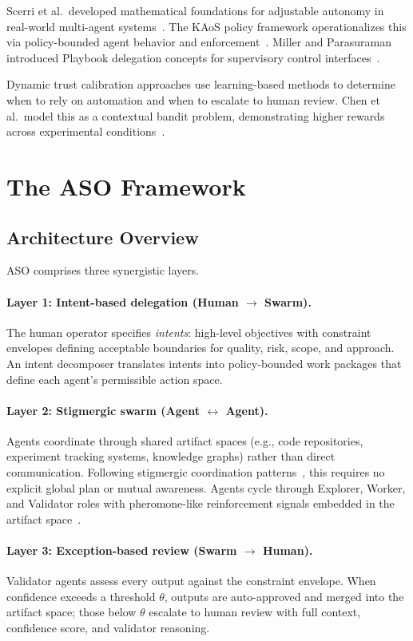\documentclass[11pt]{article}
\begin{document}
Scerri et al.\ developed mathematical foundations for adjustable autonomy in real-world multi-agent systems~\cite{scerri2002adjustable}. The KAoS policy framework operationalizes this via policy-bounded agent behavior and enforcement~\cite{bradshaw2004making}. Miller and Parasuraman introduced Playbook delegation concepts for supervisory control interfaces~\cite{miller2007flexible}.

Dynamic trust calibration approaches use learning-based methods to determine when to rely on automation and when to escalate to human review. Chen et al.\ model this as a contextual bandit problem, demonstrating higher rewards across experimental conditions~\cite{chen2025trust}.

\section{The ASO Framework}

\subsection{Architecture Overview}

ASO comprises three synergistic layers.

\paragraph{Layer 1: Intent-based delegation (Human $\rightarrow$ Swarm).} The human operator specifies \emph{intents}: high-level objectives with constraint envelopes defining acceptable boundaries for quality, risk, scope, and approach. An intent decomposer translates intents into policy-bounded work packages that define each agent's permissible action space.

\paragraph{Layer 2: Stigmergic swarm (Agent $\leftrightarrow$ Agent).} Agents coordinate through shared artifact spaces (e.g., code repositories, experiment tracking systems, knowledge graphs) rather than direct communication. Following stigmergic coordination patterns~\cite{crowston2006stigmergy,heylighen2016stigmergy}, this requires no explicit global plan or mutual awareness. Agents cycle through Explorer, Worker, and Validator roles with pheromone-like reinforcement signals embedded in the artifact space~\cite{li2025swarmsys}.

\paragraph{Layer 3: Exception-based review (Swarm $\rightarrow$ Human).} Validator agents assess every output against the constraint envelope. When confidence exceeds a threshold $\theta$, outputs are auto-approved and merged into the artifact space; those below $\theta$ escalate to human review with full context, confidence score, and validator reasoning.
\end{document}
